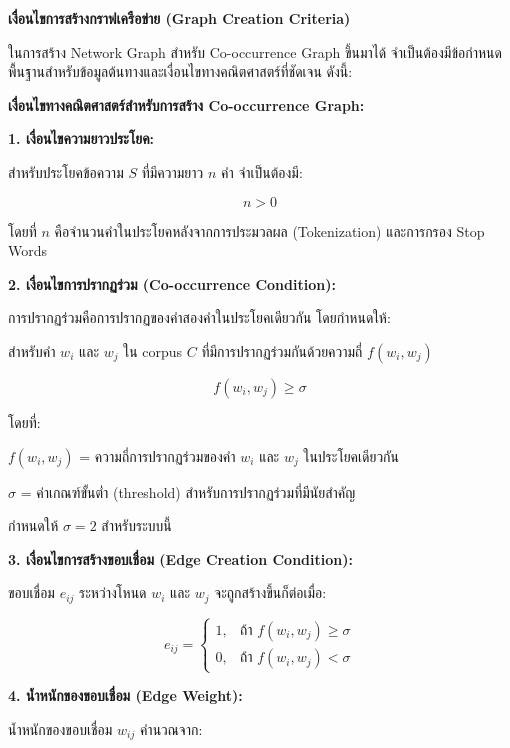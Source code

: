 \documentclass[12pt,a4paper]{article}
\begin{document}
\begin{enumerate}[leftmargin=2cm]
\begin{enumerate}
{\begin{enumerate}
            \textbf{เงื่อนไขการสร้างกราฟเครือข่าย (Graph Creation Criteria)}

            \hspace{1cm}ในการสร้าง Network Graph สำหรับ Co-occurrence Graph ขึ้นมาได้ จำเป็นต้องมีข้อกำหนดพื้นฐานสำหรับข้อมูลต้นทางและเงื่อนไขทางคณิตศาสตร์ที่ชัดเจน ดังนี้:

            \textbf{เงื่อนไขทางคณิตศาสตร์สำหรับการสร้าง Co-occurrence Graph:}

            \textbf{1. เงื่อนไขความยาวประโยค:}
            
            สำหรับประโยคข้อความ $S$ ที่มีความยาว $n$ คำ จำเป็นต้องมี:
            
            $$n > 0$$
            
            โดยที่ $n$ คือจำนวนคำในประโยคหลังจากการประมวลผล (Tokenization) และการกรอง Stop Words

            \textbf{2. เงื่อนไขการปรากฏร่วม (Co-occurrence Condition):}

            การปรากฏร่วมคือการปรากฏของคำสองคำในประโยคเดียวกัน โดยกำหนดให้:

            สำหรับคำ $w_i$ และ $w_j$ ใน corpus $C$ ที่มีการปรากฏร่วมกันด้วยความถี่ $f(w_i, w_j)$

            $$f(w_i, w_j) \geq \sigma$$

            โดยที่:
            
            $f(w_i, w_j)$ = ความถี่การปรากฏร่วมของคำ $w_i$ และ $w_j$ ในประโยคเดียวกัน
            
            $\sigma$ = ค่าเกณฑ์ขั้นต่ำ (threshold) สำหรับการปรากฏร่วมที่มีนัยสำคัญ
            
            กำหนดให้ $\sigma = 2$ สำหรับระบบนี้

            \vspace{6cm}

            \textbf{3. เงื่อนไขการสร้างขอบเชื่อม (Edge Creation Condition):}

            ขอบเชื่อม $e_{ij}$ ระหว่างโหนด $w_i$ และ $w_j$ จะถูกสร้างขึ้นก็ต่อเมื่อ:

            $$e_{ij} = \begin{cases} 
            1, & \text{ถ้า } f(w_i, w_j) \geq \sigma \\
            0, & \text{ถ้า } f(w_i, w_j) < \sigma 
            \end{cases}$$

            \textbf{4. น้ำหนักของขอบเชื่อม (Edge Weight):}

            น้ำหนักของขอบเชื่อม $w_{ij}$ คำนวณจาก:


\end{enumerate}}
\end{enumerate}
\end{enumerate}
\end{document}
